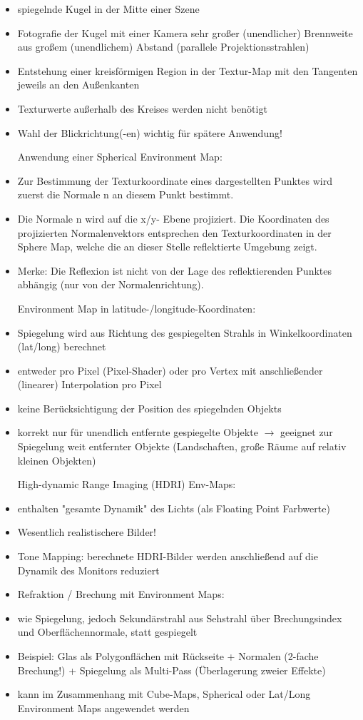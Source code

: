 \documentclass[10pt,landscape]{article}
\begin{document}
\begin{multicols}{3}
{\begin{itemize}
  
  Erstellung einer Spherical-Environment-Map-Textur:
  \item spiegelnde Kugel in der Mitte einer Szene
  \item Fotografie der Kugel mit einer Kamera sehr großer (unendlicher) Brennweite aus großem (unendlichem) Abstand (parallele Projektionsstrahlen)
  \item Entstehung einer kreisförmigen Region in der Textur-Map mit den Tangenten jeweils an den Außenkanten
  \item Texturwerte außerhalb des Kreises werden nicht benötigt
  \item Wahl der Blickrichtung(-en) wichtig für spätere Anwendung!
  
  Anwendung einer Spherical Environment Map:
  \item Zur Bestimmung der Texturkoordinate eines dargestellten Punktes wird zuerst die Normale n an diesem Punkt bestimmt.
  \item Die Normale n wird auf die x/y- Ebene projiziert. Die Koordinaten des projizierten Normalenvektors entsprechen den Texturkoordinaten in der Sphere Map, welche die an dieser Stelle reflektierte Umgebung zeigt.
  \item Merke: Die Reflexion ist nicht von der Lage des reflektierenden Punktes abhängig (nur von der Normalenrichtung).
  
  Environment Map in latitude-/longitude-Koordinaten:
  \item Spiegelung wird aus Richtung des gespiegelten Strahls in Winkelkoordinaten (lat/long) berechnet
  \item entweder pro Pixel (Pixel-Shader) oder pro Vertex mit anschließender (linearer) Interpolation pro Pixel
  \item keine Berücksichtigung der Position des spiegelnden Objekts 
  \item korrekt nur für unendlich entfernte gespiegelte Objekte $\rightarrow$ geeignet zur Spiegelung weit entfernter Objekte (Landschaften, große Räume auf relativ kleinen Objekten)
  
  
  High-dynamic Range Imaging (HDRI) Env-Maps:
  \item enthalten "gesamte Dynamik" des Lichts (als Floating Point Farbwerte)
  \item Wesentlich realistischere Bilder!
  \item Tone Mapping: berechnete HDRI-Bilder werden anschließend auf die Dynamik des Monitors reduziert
  \item Refraktion / Brechung mit Environment Maps:
  \item wie Spiegelung, jedoch Sekundärstrahl aus Sehstrahl über Brechungsindex und Oberflächennormale, statt gespiegelt
  \item Beispiel: Glas als Polygonflächen mit Rückseite + Normalen (2-fache Brechung!) + Spiegelung als Multi-Pass (Überlagerung zweier Effekte)
  \item kann im Zusammenhang mit Cube-Maps, Spherical oder Lat/Long Environment Maps angewendet werden
  

\end{itemize}}
\end{multicols}
\end{document}

